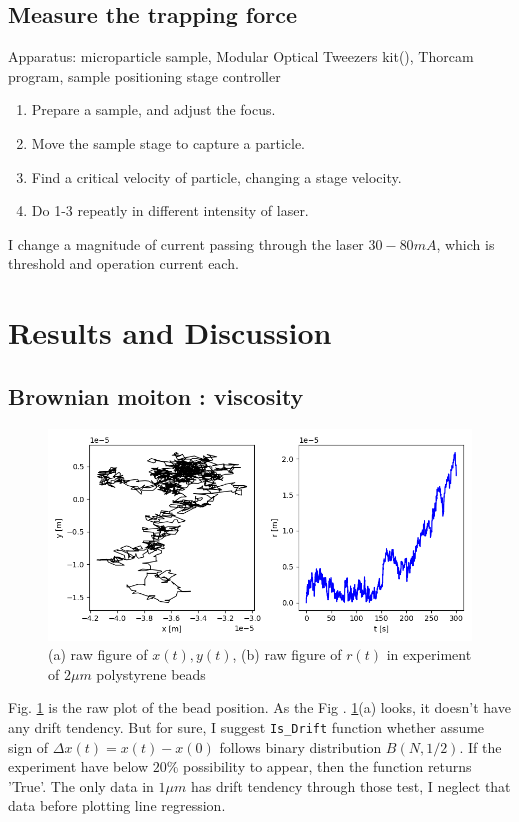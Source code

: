 \documentclass{article}
\begin{document}
\subsection{Measure the trapping force}
\noindent
Apparatus:
microparticle sample, Modular Optical Tweezers kit(\cite{opticaltweezermodule}), Thorcam program, sample positioning stage controller

\begin{enumerate}
    \item Prepare a sample, and adjust the focus.
    \item Move the sample stage to capture a particle.
    \item Find a critical velocity of particle, changing a stage velocity.
    \item Do 1-3 repeatly in different intensity of laser.
\end{enumerate}
I change a magnitude of current passing through the laser $30-80 mA$, which is threshold and operation current each.

\section{Results and Discussion}
\subsection{Brownian moiton : viscosity}
\label{results:brownian_motion_raw_fig}
\begin{figure}[h]
    \centering
    \includegraphics[width=0.8\linewidth]{../results/2um_brownian_motion_raw_fig_0.png}
    \caption{(a) raw figure of $x(t),y(t)$, (b) raw figure of $r(t)$ in experiment of $2 \mu m$ polystyrene beads}
    \label{Figure:brownian_motion_raw_fig}
\end{figure}
 Fig. \ref{Figure:brownian_motion_raw_fig} is the raw plot of the bead position.
 As the Fig . \ref{Figure:brownian_motion_raw_fig}(a) looks, it doesn't have any drift tendency.
 But for sure, I suggest \verb|Is_Drift| function whether assume sign of $\Delta x(t) = x(t) - x(0)$ follows binary distribution $B(N,1/2)$.
 If the experiment have below $20 \%$ possibility to appear, then the function returns 'True'.
 The only data in $1\mu m$ has drift tendency through those test, I neglect that data before plotting line regression.
\end{document}
